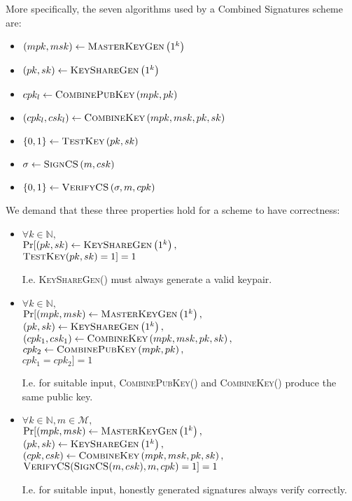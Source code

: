  More specifically, the seven algorithms used by a Combined Signatures scheme
  are:
  \begin{itemize}
    \item $\left(mpk, msk\right) \gets \textsc{MasterKeyGen}\left(1^k\right)$
    \item $\left(pk, sk\right) \gets \textsc{KeyShareGen}\left(1^k\right)$
    \item $cpk_l \gets \textsc{CombinePubKey}\left(mpk, pk\right)$
    \item $\left(cpk_l, csk_l\right) \gets \textsc{CombineKey}\left(mpk,
    msk, pk, sk\right)$
    \item $\{0, 1\} \gets \textsc{TestKey}\left(pk, sk\right)$
    \item $\sigma \gets \textsc{SignCS}\left(m, csk\right)$
    \item $\left\{0, 1\right\} \gets \textsc{VerifyCS}\left(\sigma, m,
    cpk\right)$
  \end{itemize}
  We demand that these three properties hold for a scheme to have correctness:
  \begin{itemize}
    \item $\forall k \in \mathbb{N},$ \\
    $\Pr[\left(pk, sk\right) \gets \textsc{KeyShareGen}\left(1^k\right),$ \\
    $\textsc{TestKey}(pk, sk) = 1] = 1$

    I.e. \textsc{KeyShareGen}() must always generate a valid keypair.

    \item $\forall k \in \mathbb{N},$ \\
    $\Pr[(mpk, msk) \gets \textsc{MasterKeyGen}\left(1^k\right),$ \\
    $\left(pk, sk\right) \gets \textsc{KeyShareGen}\left(1^k\right),$ \\
    $\left(cpk_1, csk_1\right) \gets \textsc{CombineKey}\left(mpk, msk, pk,
    sk\right),$ \\
    $cpk_2 \gets \textsc{CombinePubKey}\left(mpk, pk\right),$ \\
    $cpk_1 = cpk_2] = 1$

    I.e. for suitable input, \textsc{CombinePubKey}() and \textsc{CombineKey}()
    produce the same public key.

    \item $\forall k \in \mathbb{N}, m \in \mathcal{M},$ \\
    $\Pr[(mpk, msk) \gets \textsc{MasterKeyGen}\left(1^k\right),$ \\
    $\left(pk, sk\right) \gets \textsc{KeyShareGen}\left(1^k\right),$ \\
    $\left(cpk, csk\right) \gets \textsc{CombineKey}\left(mpk, msk, pk,
    sk\right),$ \\
    $\textsc{VerifyCS}(\textsc{SignCS}(m, csk), m, cpk) = 1] = 1$

    I.e. for suitable input, honestly generated signatures always verify
    correctly.
  \end{itemize}

